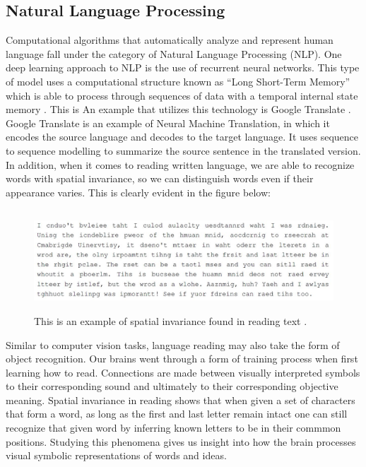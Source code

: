 \documentclass[12pt]{article}
\begin{document}
\subsection{Natural Language Processing}
Computational algorithms that automatically analyze and represent human language fall under the category of Natural Language Processing (NLP). One deep learning approach to NLP is the use of recurrent neural networks. This type of model uses a computational structure known as ``Long Short-Term Memory'' which is able to process through sequences of data with a temporal internal state memory \cite{c19}. This is An example that utilizes this technology is Google Translate \cite{c10}. Google Translate is an example of Neural Machine Translation, in which it encodes the source language and decodes to the target language. It uses sequence to sequence modelling to summarize the source sentence in the translated version. In addition, when it comes to reading written language, we are able to recognize words with spatial invariance, so we can distinguish words even if their appearance varies. This is clearly evident in the figure below:
\newpage
\begin{figure}[ht!] %
\centering
\hspace*{-0.3cm} 
\includegraphics[height=1.5in]{spatialInv.JPG}
\caption{This is an example of spatial invariance found in reading text \cite{c3}.}
\label{spatial_invariance_example}
\end{figure}

Similar to computer vision tasks, language reading may also take the form of object recognition. Our brains went through a form of training process when first learning how to read. Connections are made between visually interpreted symbols to their corresponding sound and ultimately to their corresponding objective meaning. Spatial invariance in reading shows that when given a set of characters that form a word, as long as the first and last letter remain intact one can still recognize that given word by inferring known letters to be in their commmon positions. Studying this phenomena gives us insight into how the brain processes visual symbolic representations of words and ideas. 
\end{document}
